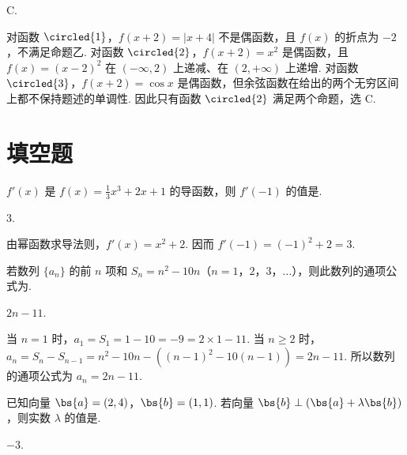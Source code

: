 \begin{answer}
C.
\end{answer}

\begin{solution}
对函数 \(\circled{1}\)，\(f(x+2)=|x+4|\) 不是偶函数，且 \(f(x)\) 的折点为 \(-2\)，不满足命题乙. 对函数 \(\circled{2}\)，\(f(x+2)=x^2\) 是偶函数，且 \(f(x)=(x-2)^2\) 在 \((-\infty,2)\) 上递减、在 \((2,+\infty)\) 上递增. 对函数 \(\circled{3}\)，\(f(x+2)=\cos x\) 是偶函数，但余弦函数在给出的两个无穷区间上都不保持题述的单调性. 因此只有函数 \(\circled{2}\) 满足两个命题，选 C.
\end{solution}

\section{填空题}
\begin{problem}
\(f'(x)\) 是 \(f(x) = \frac{1}{3} x^3 + 2x + 1\) 的导函数，则 \(f'(-1)\) 的值是\fillinblank{}.
\end{problem}

\begin{answer}
\(3\).
\end{answer}

\begin{solution}
由幂函数求导法则，\(f'(x)=x^2+2\). 因而 \(f'(-1)=(-1)^2+2=3\).
\end{solution}

\begin{problem}
若数列 \(\{a_{n}\}\) 的前 \(n\) 项和 \(S_{n} = n^{2} - 10n\)（\(n = 1\)，\(2\)，\(3\)，\(\dots\)），则此数列的通项公式为\fillinblank{}.
\end{problem}

\begin{answer}
\(2n-11\).
\end{answer}

\begin{solution}
当 \(n=1\) 时，\(a_1=S_1=1-10=-9=2\times1-11\). 当 \(n\geqslant2\) 时，
\(a_n=S_n-S_{n-1}=n^2-10n-\left((n-1)^2-10(n-1)\right)=2n-11\). 所以数列的通项公式为 \(a_n=2n-11\).
\end{solution}

\begin{problem}
已知向量 \(\bs{a} = (2,4)\)，\(\bs{b} = (1,1)\). 若向量 \(\bs{b} \perp (\bs{a} + \lambda \bs{b})\)，则实数 \(\lambda\) 的值是\fillinblank{}.
\end{problem}

\begin{answer}
\(-3\).
\end{answer}

